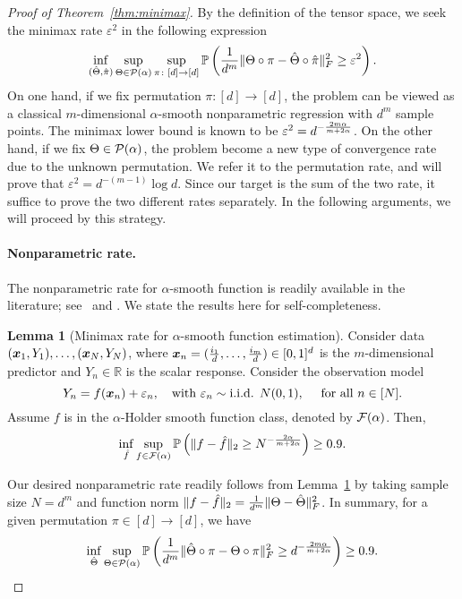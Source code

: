 \documentclass[11pt]{article}
\theoremstyle{definition}
\newtheorem{lem}[thm]{Lemma}
\begin{document}
\begin{proof}[Proof of Theorem~\ref{thm:minimax}] By the definition of the tensor space, we seek the minimax rate $\varepsilon^2$ in the following expression
\begin{equation}\label{eq:final}
\inf_{(\hat \Theta,\hat \pi)}\sup_{\Theta\in \mathcal{P}(\alpha)}\sup_{\pi\colon [d]\to[d]} \mathbb{P}\left({1\over d^m}\lVert\Theta\circ \pi-\hat \Theta\circ \hat \pi\rVert_F^2 \geq \varepsilon^2 \right).
\end{equation}
On one hand, if we fix permutation $\pi\colon[d]\to[d]$, the problem can be viewed as a classical $m$-dimensional $\alpha$-smooth nonparametric regression with $d^m$ sample points. The minimax lower bound is known to be $\varepsilon^2=d^{-{2m\alpha\over m+2\alpha}}$. On the other hand, if we fix $\Theta\in\mathcal{P}(\alpha)$, the problem become a new type of convergence rate due to the unknown permutation. We refer it to the permutation rate, and will prove that $\varepsilon^2=d^{-(m-1)}\log d$. Since our target is the sum of the two rate, it suffice to prove the two different rates separately. In the following arguments, we will proceed by this strategy. 

\paragraph{Nonparametric rate.} The nonparametric rate for $\alpha$-smooth function is readily available in the literature; see \citet[Example 16]{Wassermantext}~and \citet[Section 2]{stone1982optimal}. We state the results here for self-completeness. 

\begin{lem}[Minimax rate for $\alpha$-smooth function estimation]\label{lem:non} Consider data $(\bm x_1,Y_1), \ldots, (\bm x_N,Y_N)$, where $\bm x_n=({i_1\over d},\ldots,{i_m\over d})\in[0,1]^d$ is the $m$-dimensional predictor and $Y_n\in\mathbb{R}$ is the scalar response. Consider the observation model
\[
Y_n=f(\mx_n)+\varepsilon_n,\quad \text{with}\ \varepsilon_n \sim \text{i.i.d. }  N(0,1), \quad\text{ for all }n\in[N].
\]
Assume $f$ is in the $\alpha$-Holder smooth function class, denoted by $\mathcal{F}(\alpha)$. Then,
\begin{equation}\label{eq:non}
\inf_{\hat f}\sup_{f\in \mathcal{F}(\alpha)}\mathbb{P}\left(\lVert f-\hat f\rVert_2\geq N^{-{2\alpha\over m+2\alpha}}\right)\geq 0.9.
\end{equation}
\end{lem}
Our desired nonparametric rate readily follows from Lemma~\ref{lem:non} by taking sample size $N=d^m$ and function norm $\lVert f-\hat f\rVert_2={1\over d^m}\lVert\Theta-\hat \Theta\rVert_F^2$. In summary, for a given permutation $\pi\in[d]\to[d]$, we have
\[
\inf_{\hat \Theta}\sup_{\Theta\in \mathcal{P}(\alpha)}\mathbb{P}\left({1\over d^m}\lVert\hat \Theta\circ \pi-\Theta\circ \pi\rVert_F^2\geq d^{-{2m\alpha\over m+2\alpha}}\right) \geq 0.9.
\]




\end{proof}
\end{document}
